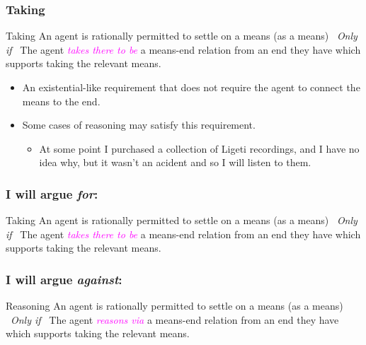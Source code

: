 \documentclass[noamssymb, compress, handout]{beamer} %
\begin{document}
  \begin{frame}
    \frametitle{Taking}

  \begin{block}{Taking}
    An agent is rationally permitted to settle on a means (as a means)
    \newline
    \mbox{ }\hfill\emph{Only if}\hfill\mbox{ }
    \newline
    The agent \textcolor{fuchsia}{\emph{takes there to be}} a means-end relation from an end they have which supports taking the relevant means.
  \end{block}

  \begin{itemize}
  \item An existential-like requirement that does not require the agent to connect the means to the end.
  \item Some cases of reasoning may satisfy this requirement.
    \begin{itemize}
    \item At some point I purchased a collection of Ligeti recordings, and I have no idea why, but it wasn't an acident and so I will listen to them.
    \end{itemize}
  \end{itemize}
\end{frame}

\begin{frame}
  \frametitle{I will argue \emph{for}:}

  \begin{block}{Taking}
    An agent is rationally permitted to settle on a means (as a means)
    \newline
    \mbox{ }\hfill\emph{Only if}\hfill\mbox{ }
    \newline
    The agent \textcolor{fuchsia}{\emph{takes there to be}} a means-end relation from an end they have which supports taking the relevant means.
  \end{block}
\end{frame}


\begin{frame}
  \frametitle{I will argue \emph{against}:}

  \begin{block}{Reasoning}
    An agent is rationally permitted to settle on a means (as a means)
    \newline
    \mbox{ }\hfill\emph{Only if}\hfill\mbox{ }
    \newline
    The agent \textcolor{fuchsia}{\emph{reasons via}} a means-end relation from an end they have which supports taking the relevant means.
  \end{block}
\end{frame}
\end{document}
